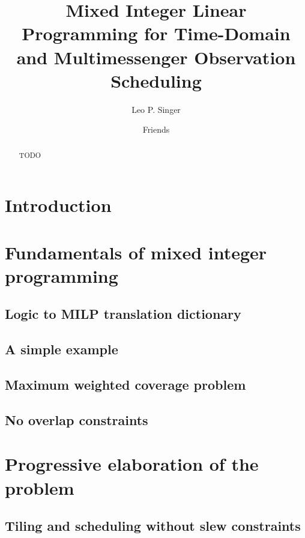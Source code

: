 \documentclass[twocolumn,times]{aastex631}
\begin{document}
\title{Mixed Integer Linear Programming for Time-Domain and Multimessenger Observation Scheduling}

\author[0000-0001-9898-5597]{Leo P. Singer}

\author{Friends}

\begin{abstract}
TODO
\end{abstract}


\section{Introduction} \label{sec:intro}

\section{Fundamentals of mixed integer programming}

\subsection{Logic to MILP translation dictionary}

\subsection{A simple example}

\subsection{Maximum weighted coverage problem}

\subsection{No overlap constraints}

\section{Progressive elaboration of the problem}

\subsection{Tiling and scheduling without slew constraints}
\end{document}
